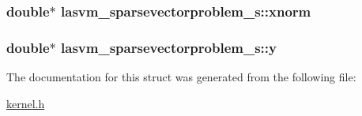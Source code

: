 \hypertarget{structlasvm__sparsevectorproblem__s_ab037c4f1713cdb345d690b18f9fdac45}{
\subsubsection[{xnorm}]{\setlength{\rightskip}{0pt plus 5cm}double$\ast$ lasvm\+\_\+sparsevectorproblem\+\_\+s\+::xnorm}}\label{structlasvm__sparsevectorproblem__s_ab037c4f1713cdb345d690b18f9fdac45}
\hypertarget{structlasvm__sparsevectorproblem__s_a58950a1217352677e5148864c3aa9075}{
\subsubsection[{y}]{\setlength{\rightskip}{0pt plus 5cm}double$\ast$ lasvm\+\_\+sparsevectorproblem\+\_\+s\+::y}}\label{structlasvm__sparsevectorproblem__s_a58950a1217352677e5148864c3aa9075}


The documentation for this struct was generated from the following file\+:\begin{DoxyCompactItemize}
\item 
\hyperlink{kernel_8h}{kernel.\+h}\end{DoxyCompactItemize}

